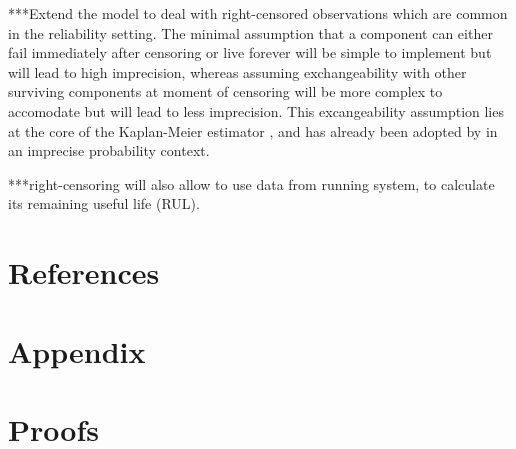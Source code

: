 \documentclass[12pt, a4paper]{elsarticle}
\begin{document}
***Extend the model to deal with right-censored observations which are common in the reliability setting.
The minimal assumption that a component can either fail immediately after censoring or live forever
will be simple to implement but will lead to high imprecision,
whereas assuming exchangeability with other surviving components at moment of censoring
will be more complex to accomodate but will lead to less imprecision.
This excangeability assumption lies at the core of the Kaplan-Meier estimator \citep{1958:kaplan-meier},
and has already been adopted by \citet{2004:coolen-yan} in an imprecise probability context.

***right-censoring will also allow to use data from running system,
to calculate its remaining useful life (RUL).




\section*{References}





\section*{Appendix}
\appendix
\renewcommand*{\thesection}{\Alph{section}}

\section{Proofs}
\label{ap:proofs}
\end{document}

